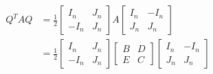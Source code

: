 \begin{align*}
    Q^TAQ&=\frac{1}{2} \begin{bmatrix}
        I_n & J_n\\
        -I_n & J_n
    \end{bmatrix} A \begin{bmatrix}
        I_n & -I_n\\
        J_n & J_n
    \end{bmatrix}\\
    &=\frac{1}{2} \begin{bmatrix}
        I_n & J_n\\
        -I_n & J_n
    \end{bmatrix} \begin{bmatrix}
        B & D\\
        E & C
    \end{bmatrix} \begin{bmatrix}
        I_n & -I_n\\
        J_n & J_n
    \end{bmatrix}
\end{align*}




